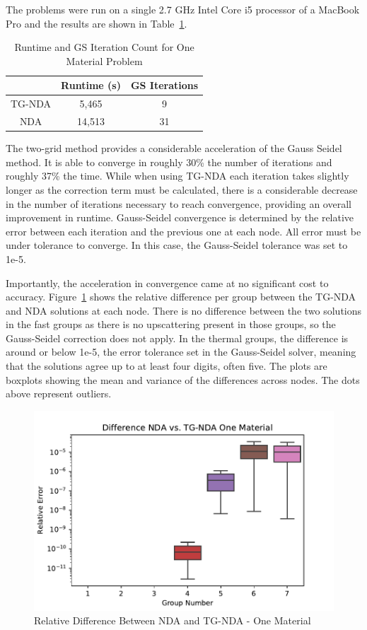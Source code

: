 The problems were run on a single 2.7 GHz Intel Core i5 processor of a MacBook Pro and the results are shown in Table~\ref{tab:onemat}.
\begin{table}[!htb]
\centering
\caption{Runtime and GS Iteration Count for One Material Problem}
    \label{tab:onemat}
\begin{center}
    \begin{tabular}{|c|c|c|}
    \hline
    & Runtime (s) & GS Iterations \\
    \hline

    TG-NDA & 5,465 & 9 \\
    NDA & 14,513 & 31 \\
    \hline
    \end{tabular}
\end{center}
\end{table}

The two-grid method provides a considerable acceleration of the Gauss Seidel method. It is able to converge in roughly 30\% the number of iterations and roughly 37\% the time. While when using TG-NDA each iteration takes slightly longer as the correction term must be calculated, there is a considerable decrease in the number of iterations necessary to reach convergence, providing an overall improvement in runtime. Gauss-Seidel convergence is determined by the relative error between each iteration and the previous one at each node. All error must be under tolerance to converge. In this case, the Gauss-Seidel tolerance was set to 1e-5.

Importantly, the acceleration in convergence came at no significant cost to accuracy. Figure~\ref{fig:OneMatErr} shows the relative difference per group between the TG-NDA and NDA solutions at each node.  There is no difference between the two solutions in the fast groups as there is no upscattering present in those groups, so the Gauss-Seidel correction does not apply. In the thermal groups, the difference is around or below 1e-5, the error tolerance set in the Gauss-Seidel solver, meaning that the solutions agree up to at least four digits, often five. The plots are boxplots showing the mean and variance of the differences across nodes. The dots above represent outliers. 

\begin{figure}[H]
    \centering
    \includegraphics[width=.75\textwidth]{fig/OneMatErr.pdf}
    \caption{Relative Difference Between NDA and TG-NDA - One Material}
    \label{fig:OneMatErr}
\end{figure}

